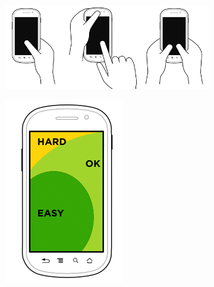 \begin{figure}[H]
        \centering
        \begin{subfigure}[b]{0.7\textwidth}
                \centering
                \includegraphics[width=\textwidth]{img/tnav-touch-phones.png}
        \end{subfigure}%
        \begin{subfigure}[b]{0.2\textwidth}
                \centering
                \includegraphics[width=\textwidth]{img/tnav-touch-phones2.png}
        \end{subfigure}


\end{figure}
